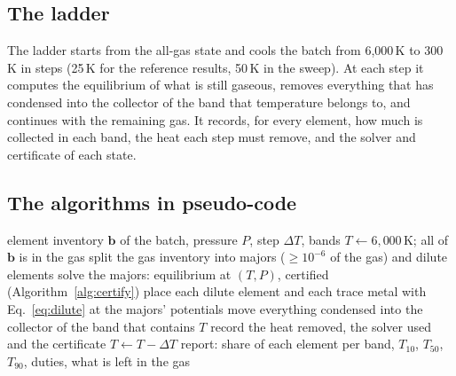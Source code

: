 \documentclass[11pt,a4paper]{article}
\begin{document}
\subsection{The ladder}
The ladder starts from the all-gas state and cools the batch from 6,000\,K to 300\,K in steps (25\,K for the reference results, 50\,K in the sweep). At each step it computes the equilibrium of what is still gaseous, removes everything that has condensed into the collector of the band that temperature belongs to, and continues with the remaining gas. It records, for every element, how much is collected in each band, the heat each step must remove, and the solver and certificate of each state.

\subsection{The algorithms in pseudo-code}
\begin{algorithm}[H]
\caption{The condensation ladder (\texttt{ladder.run\_ladder})}
\begin{algorithmic}[1]
\Require element inventory $\mathbf b$ of the batch, pressure $P$, step $\Delta T$, bands
\State $T \gets 6{,}000$\,K; all of $\mathbf b$ is in the gas
  \State split the gas inventory into majors ($\ge 10^{-6}$ of the gas) and dilute elements
  \State solve the majors: equilibrium at $(T, P)$, certified (Algorithm~\ref{alg:certify})
  \State place each dilute element and each trace metal with Eq.~\ref{eq:dilute} at the majors' potentials
  \State move everything condensed into the collector of the band that contains $T$
  \State record the heat removed, the solver used and the certificate
  \State $T \gets T - \Delta T$
\EndWhile
\State report: share of each element per band, $T_{10}$, $T_{50}$, $T_{90}$, duties, what is left in the gas
\end{algorithmic}
\end{algorithm}
\end{document}
